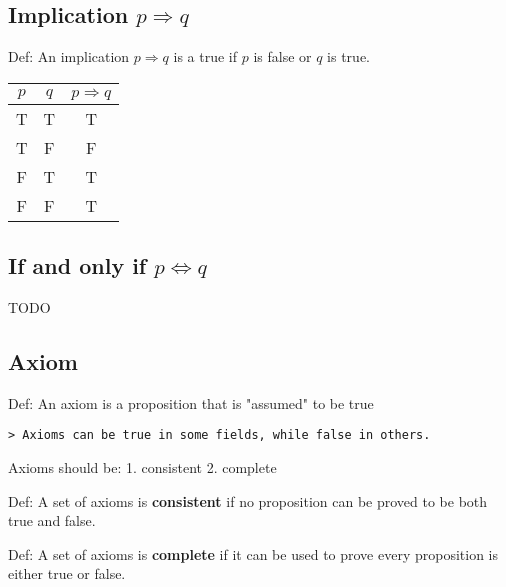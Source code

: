 \documentclass[12pt,a4paper]{article}
\begin{document}
\subsection*{Implication $p \Rightarrow q$} 
Def: An implication $p \Rightarrow q$ is a true if $p$ is false or $q$ is true.

\begin{tabular}{|c|c|c|}
\hline
$p$ & $q$ & $p \Rightarrow q$ \\
\hline
T & T & T \\
T & F & F \\
F & T & T \\
F & F & T \\
\hline
\end{tabular}

\subsection*{If and only if $p \Leftrightarrow q$}
{TODO}
\subsection*{Axiom}
Def: An axiom is a proposition that is "assumed" to be true

\texttt{> Axioms can be true in some fields, while false in others.}

Axioms should be: 1. consistent 2. complete

Def: A set of axioms is \textbf{consistent} if no proposition can be proved to be both true and false.

Def: A set of axioms is \textbf{complete} if it can be used to prove every proposition is either true or false.
\end{document}
